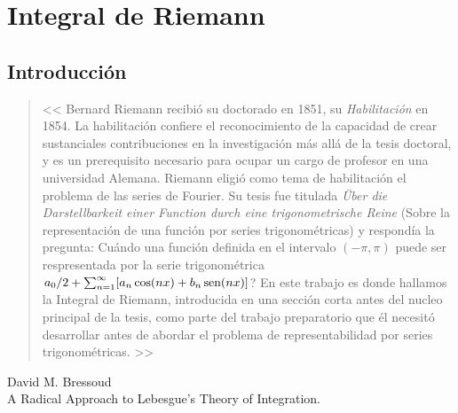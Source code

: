 \chapter{Integral de Riemann}

\section{Introducción}

\begin{quotation}
<< Bernard Riemann recibió su doctorado en 1851, su \emph{Habilitación} en 1854. La habilitación confiere el reconocimiento de la capacidad de crear sustanciales contribuciones en la investigación más allá de la tesis doctoral, y es un prerequisito necesario para ocupar un cargo de profesor en una universidad Alemana. Riemann eligió como tema  de habilitación el problema de las series de Fourier. Su tesis fue titulada \emph{\"Uber die Darstellbarkeit einer Function durch eine trigonometrische Reine} (Sobre la representación de una función por series trigonométricas) y respondía la pregunta:  Cuándo una función definida en el intervalo $(-\pi,\pi)$ puede ser respresentada por la serie trigonométrica $a_0/2+\sum_{n=1}^{\infty}[a_n\cos(nx)+b_n\operatorname{sen}(nx)]$? 
En este trabajo  es donde hallamos   la Integral de Riemann, introducida en una sección corta antes del nucleo principal de la tesis, como parte del trabajo preparatorio que él necesitó desarrollar antes de abordar el problema de representabilidad por series trigonométricas. >> 
\end{quotation}
\begin{flushright}
 David M. Bressoud\\
 A Radical Approach to Lebesgue's Theory of Integration.\lectura
\end{flushright}


